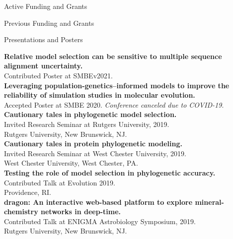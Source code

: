 \documentclass{resume} %
\begin{document}
\begin{rSection}{Active Funding and Grants}
\begin{rSection}{Previous Funding and Grants}
\end{rSection}




\vspace*{0.5cm}
\begin{rSection}{Presentations and Posters}
\vspace*{0.25cm}


\textbf{Relative model selection can be sensitive to multiple sequence alignment uncertainty.}
\\ Contributed Poster at SMBEv2021. \\


\textbf{Leveraging population-genetics--informed models to improve the reliability of simulation studies in molecular evolution.}
\\ Accepted Poster at SMBE 2020. \emph{Conference canceled due to COVID-19}. \\

\textbf{Cautionary tales in phylogenetic model selection.}
\\ Invited Research Seminar at Rutgers University, 2019.
\\ Rutgers University, New Brunswick, NJ.\\


\textbf{Cautionary tales in protein phylogenetic modeling.}
\\ Invited Research Seminar at West Chester University, 2019.
\\ West Chester University, West Chester, PA.\\


\textbf{Testing the role of model selection in phylogenetic accuracy.}
\\ Contributed Talk at Evolution 2019.
\\ Providence, RI.\\

\textbf{dragon: An interactive web-based platform to explore mineral-chemistry networks in deep-time.} 
\\ Contributed Talk at ENIGMA Astrobiology Symposium, 2019.
\\ Rutgers University, New Brunswick, NJ.\\



\end{rSection}
\end{rSection}
\end{document}
